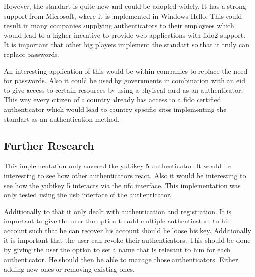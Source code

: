 \documentclass[a4paper, 11pt]{scrartcl}
\begin{document}
However, the standart is quite new and could be adopted widely. It has a strong support from Microsoft, where it is implemented in Windows Hello. This could result in many companies supplying authenticators to their employees which would lead to a higher incentive to provide web applications with \gls{fido2} support. It is important that other big players implement the standart so that it truly can replace passwords.

An interesting application of this would be within companies to replace the need for passwords. Also it could be used by governments in combination with an \gls{eid} to give access to certain resources by using a phyiscal card as an authenticator. This way every citizen of a country already has access to a \gls{fido} certified authenticator which would lead to country specific sites implementing the standart as an authentication method. 

\subsection{Further Research}

This implementation only covered the yubikey 5 authenticator. It would be interesting to see how other authenticators react. Also it would be interesting to see how the yubikey 5 interacts via the \gls{nfc} interface. This implementation was only tested using the \gls{usb} interface of the authenticator. 

Additionally to that it only dealt with authentication and registration. It is important to give the user the option to add multiple authenticators to his account such that he can recover his account should he loose his key. Additionally it is important that the user can revoke their authenticators. This should be done by giving the user the option to set a name that is relevant to him for each authenticator. He should then be able to manage those authenticators. Either adding new ones or removing existing ones. 

\clearpage

\printglossaries

\clearpage

\printbibliography[heading=bibintoc]
\end{document}
